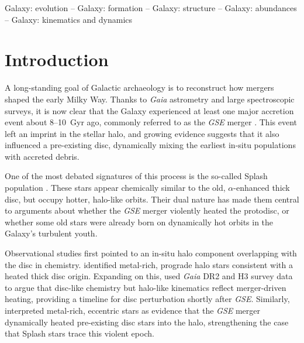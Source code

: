 \documentclass[fleqn,usenatbib]{mnras}
\begin{document}
\begin{abstract}
\end{abstract}

\begin{keywords}
Galaxy: evolution -- Galaxy: formation -- Galaxy: structure -- Galaxy: abundances -- Galaxy: kinematics and dynamics
\end{keywords}


\section{Introduction}
\label{sec:introduction}

A long-standing goal of Galactic archaeology is to reconstruct how mergers shaped the early Milky Way. Thanks to \textit{Gaia} astrometry \citep{Brown2021b} and large spectroscopic surveys, it is now clear that the Galaxy experienced at least one major accretion event about 8--10~Gyr ago, commonly referred to as the \textit{GSE} merger \citep{Belokurov2018, Helmi2018, Naidu2020}. This event left an imprint in the stellar halo, and growing evidence suggests that it also influenced a pre-existing disc, dynamically mixing the earliest in-situ populations with accreted debris.

One of the most debated signatures of this process is the so-called Splash population \citep{Belokurov2020, Belokurov2022}. These stars appear chemically similar to the old, $\alpha$-enhanced thick disc, but occupy hotter, halo-like orbits. Their dual nature has made them central to arguments about whether the \textit{GSE} merger violently heated the protodisc, or whether some old stars were already born on dynamically hot orbits in the Galaxy’s turbulent youth.

Observational studies first pointed to an in-situ halo component overlapping with the disc in chemistry. \citet{Bonaca2017} identified metal-rich, prograde halo stars consistent with a heated thick disc origin. Expanding on this, \citet{Bonaca2020} used \textit{Gaia} DR2 and H3 survey data to argue that disc-like chemistry but halo-like kinematics reflect merger-driven heating, providing a timeline for disc perturbation shortly after \textit{GSE}. Similarly, \citet{DiMatteo2019,DiMatteo2020} interpreted metal-rich, eccentric stars as evidence that the \textit{GSE} merger dynamically heated pre-existing disc stars into the halo, strengthening the case that Splash stars trace this violent epoch.
\end{document}
